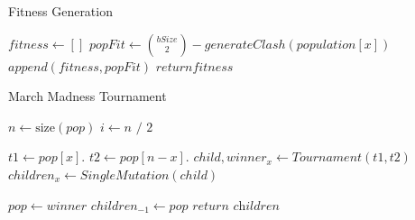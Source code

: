 \documentclass{vgtc}                          %
\begin{document}
\begin{algorithm}
  \caption{Fitness Generation}\label{Fitness}
  \begin{algorithmic}[1]
    \State $fitness \gets []$
        \State $popFit \gets \binom{bSize}{2} - generateClash(population[x])$
        \State $append(fitness,popFit)$
      \EndFor
    \State $return fitness$
    \EndProcedure
  \end{algorithmic}
\end{algorithm}

\begin{algorithm}
  \caption{March Madness Tournament}\label{madness}
  \begin{algorithmic}[1]
        \State $\textit{n} \gets \text{size}(pop)$
        \State $i \gets \textit{n / 2}$
        
          \State $t1 \gets pop[x]$.
          \State $t2 \gets pop[n-x]$.
          \State $child ,winner_x \gets \textit{Tournament}(t1,t2)$
          \State $children_x \gets SingleMutation(child)$
        \EndFor
        
        \State $pop \gets winner$
      \EndWhile
      \State $children_{-1} \gets pop$
      \State $\textit{return children}$
    \EndProcedure
  \end{algorithmic}
\end{algorithm}
\end{document}
